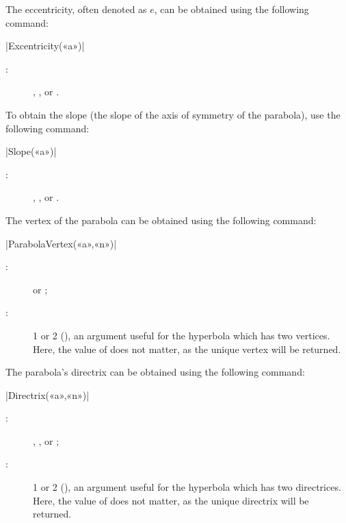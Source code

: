 \documentclass[a4paper,english]{article}
\begin{document}
The eccentricity, often denoted as $e$, can be obtained using the following command:

\begin{colourband}
\macro|Excentricity(«a»)|
\begin{description}
  \item[:]  , , or .
\end{description}
\end{colourband}
\bigskip

To obtain the slope (the slope of the axis of symmetry of the parabola), use the following command:

\begin{colourband}
\macro|Slope(«a»)|
\begin{description}
  \item[:]  , , or .
\end{description}
\end{colourband}
\bigskip
The vertex of the parabola can be obtained using the following command:

\begin{colourband}
\macro|ParabolaVertex(«a»,«n»)|
\begin{description}
  \item[:]   or ;
  \item[:]  1 or 2 (), an argument useful for the
  hyperbola  which has two vertices. Here, the value of  does not
  matter, as the unique   vertex will be returned.
\end{description}
\end{colourband}
\bigskip
The parabola's directrix can be obtained using the following command:

\begin{colourband}
\macro|Directrix(«a»,«n»)|
\begin{description}
  \item[:]  , , or ; 
  \item[:]  1 or 2 (), an argument useful for the
  hyperbola   which has two directrices. Here, the value of  does not
  matter,
  as the unique directrix will be returned.
\end{description}
\end{colourband}
\bigskip
\end{document}
